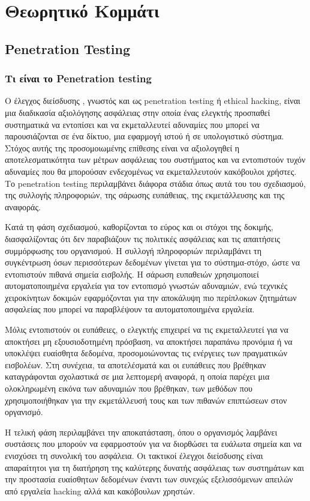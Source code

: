 \section{Θεωρητικό Κομμάτι}
\subsection{\lt Penetration Testing}
\subsubsection{\gt Tι είναι το \lt Penetration testing}
{ 
\hspace*{2em}  Ο έλεγχος διείσδυσης , γνωστός και ως \lt penetration testing \gt ή \lt ethical hacking, \gt είναι μια διαδικασία αξιολόγησης ασφάλειας στην οποία ένας ελεγκτής προσπαθεί συστηματικά να εντοπίσει και να εκμεταλλευτεί αδυναμίες που μπορεί να παρουσιάζονται σε ένα δίκτυο, μια εφαρμογή ιστού ή σε υπολογιστικό σύστημα. Στόχος αυτής της προσομοιωμένης επίθεσης είναι να αξιολογηθεί η αποτελεσματικότητα των μέτρων ασφάλειας του συστήματος και να εντοπιστούν τυχόν αδυναμίες που θα μπορούσαν ενδεχομένως να εκμεταλλευτούν κακόβουλοι χρήστες. Το \lt penetration testing \gt περιλαμβάνει διάφορα στάδια όπως αυτά του του σχεδιασμού, της συλλογής πληροφοριών, της σάρωσης ευπάθειας, της εκμετάλλευσης και της αναφοράς.



\hspace*{1em} Κατά τη φάση σχεδιασμού, καθορίζονται το εύρος και οι στόχοι της δοκιμής, διασφαλίζοντας ότι δεν παραβιάζουν  τις πολιτικές ασφάλειας και τις απαιτήσεις συμμόρφωσης του οργανισμού. Η συλλογή πληροφοριών περιλαμβάνει τη συγκέντρωση όσων περισσότερων δεδομένων γίνεται για το σύστημα-στόχο, ώστε να εντοπιστούν πιθανά σημεία εισβολής. Η σάρωση ευπαθειών χρησιμοποιεί αυτοματοποιημένα εργαλεία για τον εντοπισμό γνωστών αδυναμιών, ενώ τεχνικές χειροκίνητων δοκιμών εφαρμόζονται για την αποκάλυψη πιο περίπλοκων ζητημάτων ασφαλείας που μπορεί να παραβλέψουν τα αυτοματοποιημένα εργαλεία.

\hspace*{1em}Μόλις εντοπιστούν οι ευπάθειες, ο ελεγκτής επιχειρεί να τις εκμεταλλευτεί για να αποκτήσει μη εξουσιοδοτημένη πρόσβαση, να αποκτήσει παραπάνω προνόμια ή να υποκλέψει ευαίσθητα δεδομένα, προσομοιώνοντας τις ενέργειες των πραγματικών εισβολέων. Στη συνέχεια, τα αποτελέσματά και οι ευπάθειες που βρέθηκαν καταγράφονται σχολαστικά σε μια λεπτομερή αναφορά, η οποία παρέχει μια ολοκληρωμένη εικόνα των αδυναμιών που βρέθηκαν, των μεθόδων που χρησιμοποιήθηκαν για την εκμετάλλευσή τους και των πιθανών επιπτώσεων στον οργανισμό.

\hspace*{1em}Η τελική φάση περιλαμβάνει την αποκατάσταση, όπου ο οργανισμός λαμβάνει συστάσεις που μπορούν να εφαρμοστούν για να διορθώσει τα ευάλωτα  σημεία και να ενισχύσει τη συνολική του ασφάλεια. Οι τακτικοί έλεγχοι διείσδυσης είναι απαραίτητοι για τη διατήρηση της καλύτερης δυνατής ασφάλειας των συστημάτων και την προστασία ευαίσθητων δεδομένων έναντι των συνεχώς εξελισσόμενων απειλών από εργαλεία \lt hacking \gt αλλά και κακόβουλων χρηστών.
} 
